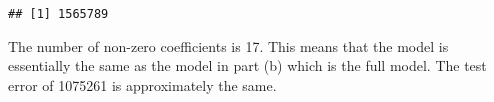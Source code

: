 \documentclass[
]{article}
\newenvironment{Shaded}{\begin{snugshade}}{\end{snugshade}}
\newcommand{\CommentTok}[1]{\textcolor[rgb]{0.56,0.35,0.01}{\textit{#1}}}
\newcommand{\DataTypeTok}[1]{\textcolor[rgb]{0.13,0.29,0.53}{#1}}
\newcommand{\DecValTok}[1]{\textcolor[rgb]{0.00,0.00,0.81}{#1}}
\newcommand{\KeywordTok}[1]{\textcolor[rgb]{0.13,0.29,0.53}{\textbf{#1}}}
\newcommand{\NormalTok}[1]{#1}
\newcommand{\OperatorTok}[1]{\textcolor[rgb]{0.81,0.36,0.00}{\textbf{#1}}}
\newcommand{\StringTok}[1]{\textcolor[rgb]{0.31,0.60,0.02}{#1}}
\begin{document}
\begin{Shaded}
\end{Shaded}

\begin{verbatim}
## [1] 1565789
\end{verbatim}

The number of non-zero coefficients is 17. This means that the model is
essentially the same as the model in part (b) which is the full model.
The test error of 1075261 is approximately the same.
\end{document}
